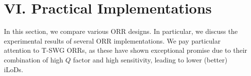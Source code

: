 \documentclass[aps,prl,twocolumn, superscriptaddress,nobalancelastpage]{revtex4}
\begin{document}






\section{VI. Practical Implementations}
\vspace{-1em}


In this section, we compare various ORR designs. In particular, we discuss the experimental results of several ORR implementations. We pay particular attention to T-SWG ORRs, as these have shown exceptional promise due to their combination of high $Q$ factor and high sensitivity, leading to lower (better) iLoDs.


\end{document}
